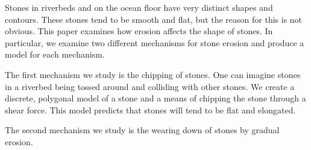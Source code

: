 Stones in riverbeds and on the ocean floor have very distinct shapes and contours. These stones tend to be smooth and flat, but the reason for this is not obvious. This paper examines how erosion affects the shape of stones. In particular, we examine two different mechanisms for stone erosion and produce a model for each mechanism.

The first mechanism we study is the chipping of stones. One can imagine stones in a riverbed being tossed around and colliding with other stones. We create a discrete, polygonal model of a stone and a means of chipping the stone through a shear force. This model predicts that stones will tend to be flat and elongated.

The second mechanism we study is the wearing down of stones by gradual erosion.

